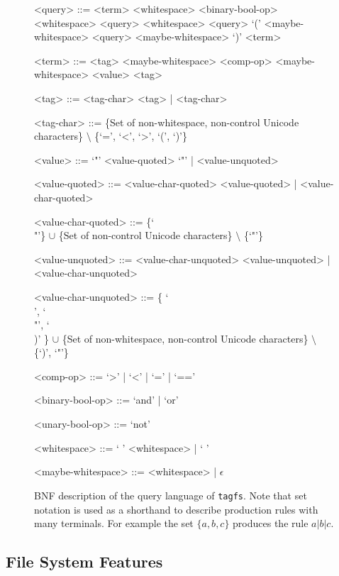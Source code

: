 \begin{figure}[h]
\begin{grammar}
<query> ::= <term> <whitespace> <binary-bool-op> <whitespace> <query>
     <whitespace> <query>
    \alt `(' <maybe-whitespace> <query> <maybe-whitespace> `)'
    \alt <term>

<term> ::= <tag> <maybe-whitespace> <comp-op> <maybe-whitespace> <value>
    \alt <tag>

<tag> ::= <tag-char> <tag> | <tag-char>

<tag-char> ::= \{Set of non-whitespace, non-control Unicode characters\}
    $\setminus$ \{`=', `<', `>', `(', `)'\}

<value> ::= `"' <value-quoted> `"' | <value-unquoted>

<value-quoted> ::= <value-char-quoted> <value-quoted>
    | <value-char-quoted>

    <value-char-quoted> ::= \{`\\"'\} $\cup$ \{Set of non-control Unicode
        characters\} $\setminus$ \{`"'\}

<value-unquoted> ::= <value-char-unquoted> <value-unquoted>
    | <value-char-unquoted>

<value-char-unquoted> ::= \{ `\\ ', `\\"', `\\)' \} $\cup$ \{Set of
    non-whitespace, non-control Unicode characters\} $\setminus$ \{`)', `"'\}

<comp-op> ::= `>' | `<' | `=' | `=='

<binary-bool-op> ::= `and' | `or'

<unary-bool-op> ::= `not'

<whitespace> ::= ` ' <whitespace> | ` '

<maybe-whitespace> ::= <whitespace> | $\epsilon$

\end{grammar}
\label{fig:query-bnf}
\caption[BNF description of the query language of \texttt{tagfs}]
    {BNF description of the query language of \texttt{tagfs}. Note that set
    notation is used as a shorthand to describe production rules with many
    terminals. For example the set $\{a, b, c\}$ produces the rule $a \vert b
    \vert c$. }
\end{figure}

\subsection{File System Features}
\label{sec:fs-features}

